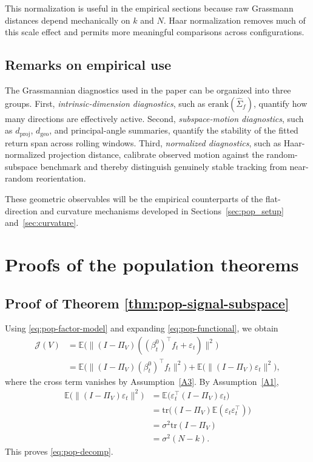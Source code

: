 \documentclass[11pt,letterpaper]{article}
\newcommand{\tr}{\mathrm{tr}}
\newcommand{\erank}{\mathrm{erank}}
\newcommand{\cJ}{\mathcal{J}}
\begin{document}
This normalization is useful in the empirical sections because raw Grassmann distances depend mechanically on $k$ and $N$. Haar normalization removes much of this scale effect and permits more meaningful comparisons across configurations.

\subsection{Remarks on empirical use}

The Grassmannian diagnostics used in the paper can be organized into three groups. First, \emph{intrinsic-dimension diagnostics}, such as $\erank(\hat\Sigma_f)$, quantify how many directions are effectively active. Second, \emph{subspace-motion diagnostics}, such as $d_{\mathrm{proj}}$, $d_{\mathrm{geo}}$, and principal-angle summaries, quantify the stability of the fitted return span across rolling windows. Third, \emph{normalized diagnostics}, such as Haar-normalized projection distance, calibrate observed motion against the random-subspace benchmark and thereby distinguish genuinely stable tracking from near-random reorientation.

These geometric observables will be the empirical counterparts of the flat-direction and curvature mechanisms developed in Sections~\ref{sec:pop_setup} and~\ref{sec:curvature}.

\section{Proofs of the population theorems}
\label{sec:proofs}

\subsection{Proof of Theorem \ref{thm:pop-signal-subspace}}

Using \eqref{eq:pop-factor-model} and expanding \eqref{eq:pop-functional}, we obtain
\begin{equation*}
\begin{split}
\cJ(V)
&=\mathbb{E}\big(\|(I-\Pi_V)((\beta_t^0)^\top f_t+\varepsilon_t)\|^2\big)\\
&=\mathbb{E}\big(\|(I-\Pi_V)(\beta_t^0)^\top f_t\|^2\big)+\mathbb{E}\big(\|(I-\Pi_V)\varepsilon_t\|^2\big),
\end{split}
\end{equation*}
where the cross term vanishes by Assumption~\ref{A3}. By Assumption~\ref{A1},
\begin{equation*}
\begin{split}
\mathbb{E}\big(\|(I-\Pi_V)\varepsilon_t\|^2\big)
&=\mathbb{E}\big(\varepsilon_t^\top (I-\Pi_V)\varepsilon_t\big)\\
&=\tr\big((I-\Pi_V)\mathbb{E}(\varepsilon_t\varepsilon_t^\top)\big)\\
&=\sigma^2\tr(I-\Pi_V)\\
&= \sigma^2(N-k).
\end{split}
\end{equation*}
This proves \eqref{eq:pop-decomp}.
\end{document}
